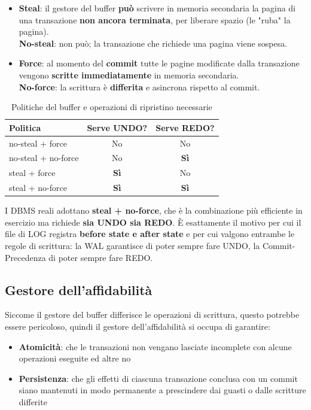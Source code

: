 \documentclass[a4paper,twoside]{article}
\begin{document}
\begin{itemize}
  \item \textbf{Steal}: il gestore del buffer \textbf{può} scrivere in memoria
    secondaria la pagina di una transazione \textbf{non ancora terminata}, per liberare
    spazio (le "ruba" la pagina).\\
    \textbf{No-steal}: non può; la transazione che richiede una pagina viene sospesa.

  \item \textbf{Force}: al momento del \textbf{commit} tutte le pagine modificate dalla
    transazione vengono \textbf{scritte immediatamente} in memoria secondaria.\\
    \textbf{No-force}: la scrittura è \textbf{differita} e asincrona rispetto al commit.
\end{itemize}

\begin{table}[H]
  \centering
  \small
  \begin{tabular}{@{}lcc@{}}
    \toprule
    \textbf{Politica} & \textbf{Serve UNDO?} & \textbf{Serve REDO?} \\
    \midrule
    no-steal + force    & No           & No \\
    no-steal + no-force & No           & \textbf{Sì} \\
    steal + force       & \textbf{Sì}  & No \\
    steal + no-force    & \textbf{Sì}  & \textbf{Sì} \\
    \bottomrule
  \end{tabular}
  \caption{Politiche del buffer e operazioni di ripristino necessarie}
\end{table}

\noindent
I DBMS reali adottano \textbf{steal + no-force}, che è la combinazione più efficiente
in esercizio ma richiede \textbf{sia UNDO sia REDO}. È esattamente il motivo per cui il
file di LOG registra \textbf{before state e after state} e per cui valgono entrambe le
regole di scrittura: la WAL garantisce di poter sempre fare UNDO, la
Commit-Precedenza di poter sempre fare REDO.

\subsection{Gestore dell'affidabilità}
Siccome il gestore del buffer differisce le operazioni di scrittura, questo potrebbe
essere pericoloso, quindi il gestore dell'affidabilità si occupa di garantire:
\begin{itemize}
  \item \textbf{Atomicità}: che le transazioni non vengano lasciate incomplete con
    alcune operazioni eseguite ed altre no

  \item \textbf{Persistenza}: che gli effetti di ciascuna transazione conclusa
    con un commit siano mantenuti in modo permanente a prescindere dai guasti
    o dalle scritture differite
\end{itemize}
\end{document}
